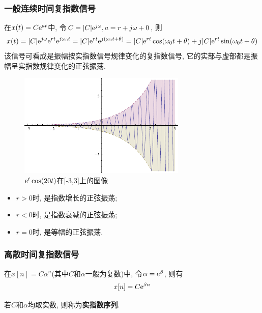         \subsubsection{一般连续时间复指数信号}

            在$x(t)=C\mathrm{e}^{at}$中, 令$C=|C|\mathrm{e}^{j\omega}, a=r+j\omega+0$, 则
            \[x(t)=|C|\mathrm{e}^{j\omega}\mathrm{e}^{rt}\mathrm{e}^{j\omega_0t}=|C|\mathrm{e}^{rt}\mathrm{e}^{j(\omega_0t+\theta)}=|C|\mathrm{e}^{rt}\cos(\omega_0t+\theta)+j|C|\mathrm{e}^{rt}\sin(\omega_0t+\theta)\]
            该信号可看成是振幅按实指数信号规律变化的复指数信号, 它的实部与虚部都是振幅呈实指数规律变化的正弦振荡.

            \begin{figure}[h]\centering
                \includegraphics[width=8cm]{signals_chaps/lect2_inc/compsignal.pdf}
                \caption{$\mathrm{e}^t\cos(20t)$在[-3,3]上的图像}
                \label{fig:2:comp-signal}
            \end{figure}

            \begin{itemize}
                \item $r>0$时, 是指数增长的正弦振荡;
                \item $r<0$时, 是指数衰减的正弦振荡;
                \item $r=0$时, 是等幅的正弦振荡.
            \end{itemize}
        
        \subsubsection{离散时间复指数信号}

            在$x[n]=C\alpha ^n$(其中$C$和$\alpha $一般为复数)中, 令$\alpha =\mathrm{e}^\beta $, 则有
            \[x[n]=C\mathrm{e}^{\beta n}\]

            若$C$和$\alpha$均取实数, 则称为\textbf{实指数序列}.


